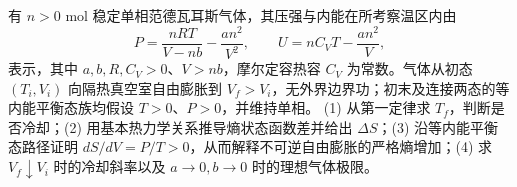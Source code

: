 有 \(n>0\) mol 稳定单相范德瓦耳斯气体，其压强与内能在所考察温区内由
\[
P=\frac{nRT}{V-nb}-\frac{an^2}{V^2},\qquad
U=nC_VT-\frac{an^2}{V},
\]
表示，其中 \(a,b,R,C_V>0\)、\(V>nb\)，摩尔定容热容 \(C_V\) 为常数。气体从初态 \((T_i,V_i)\) 向隔热真空室自由膨胀到 \(V_f>V_i\)，无外界边界功；初末及连接两态的等内能平衡态族均假设 \(T>0\)、\(P>0\)，并维持单相。
(1) 从第一定律求 \(T_f\)，判断是否冷却；(2) 用基本热力学关系推导熵状态函数差并给出 \(\Delta S\)；(3) 沿等内能平衡态路径证明 \(dS/dV=P/T>0\)，从而解释不可逆自由膨胀的严格熵增加；(4) 求 \(V_f\downarrow V_i\) 时的冷却斜率以及 \(a\to0,b\to0\) 时的理想气体极限。
